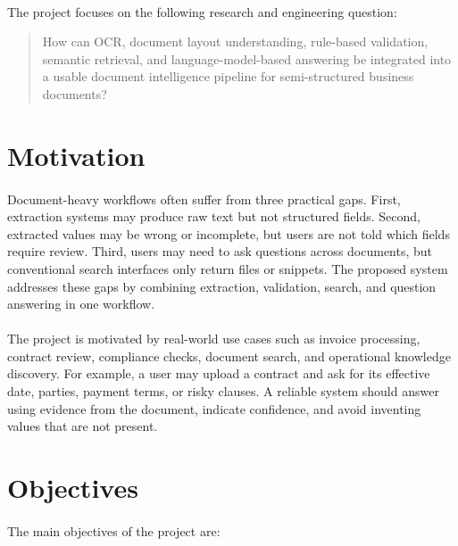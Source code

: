 \paragraph{} The project focuses on the following research and engineering question:

\begin{quote}
How can OCR, document layout understanding, rule-based validation, semantic retrieval, and language-model-based answering be integrated into a usable document intelligence pipeline for semi-structured business documents?
\end{quote}

\section{Motivation}
\paragraph{} Document-heavy workflows often suffer from three practical gaps. First, extraction systems may produce raw text but not structured fields. Second, extracted values may be wrong or incomplete, but users are not told which fields require review. Third, users may need to ask questions across documents, but conventional search interfaces only return files or snippets. The proposed system addresses these gaps by combining extraction, validation, search, and question answering in one workflow.

\paragraph{} The project is motivated by real-world use cases such as invoice processing, contract review, compliance checks, document search, and operational knowledge discovery. For example, a user may upload a contract and ask for its effective date, parties, payment terms, or risky clauses. A reliable system should answer using evidence from the document, indicate confidence, and avoid inventing values that are not present.

\section{Objectives}
\paragraph{} The main objectives of the project are:

